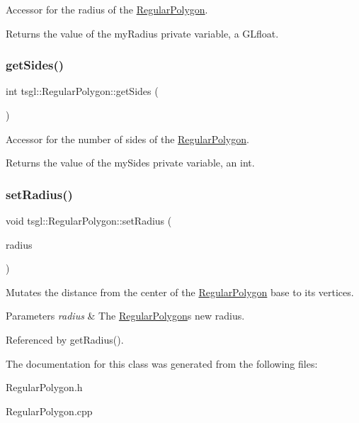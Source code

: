Accessor for the radius of the \hyperlink{classtsgl_1_1_regular_polygon}{Regular\+Polygon}. 

Returns the value of the my\+Radius private variable, a G\+Lfloat. \mbox{\label{classtsgl_1_1_regular_polygon_ac3f500be681b6d43f75ec00bf5434be0}} 
\subsubsection{\texorpdfstring{get\+Sides()}{getSides()}}
{\footnotesize\ttfamily int tsgl\+::\+Regular\+Polygon\+::get\+Sides (\begin{DoxyParamCaption}{ }\end{DoxyParamCaption})\hspace{0.3cm}{\ttfamily [inline]}}



Accessor for the number of sides of the \hyperlink{classtsgl_1_1_regular_polygon}{Regular\+Polygon}. 

Returns the value of the my\+Sides private variable, an int. \mbox{\label{classtsgl_1_1_regular_polygon_a3c4240fc8d95e6875fc716b26504000e}} 
\subsubsection{\texorpdfstring{set\+Radius()}{setRadius()}}
{\footnotesize\ttfamily void tsgl\+::\+Regular\+Polygon\+::set\+Radius (\begin{DoxyParamCaption}\item[{G\+Lfloat}]{radius }\end{DoxyParamCaption})}



Mutates the distance from the center of the \hyperlink{classtsgl_1_1_regular_polygon}{Regular\+Polygon} base to its vertices. 


\begin{DoxyParams}{Parameters}
{\em radius} & The \hyperlink{classtsgl_1_1_regular_polygon}{Regular\+Polygon}\textquotesingle{}s new radius. \\
\hline
\end{DoxyParams}


Referenced by get\+Radius().



The documentation for this class was generated from the following files\+:\begin{DoxyCompactItemize}
\item 
Regular\+Polygon.\+h\item 
Regular\+Polygon.\+cpp\end{DoxyCompactItemize}
